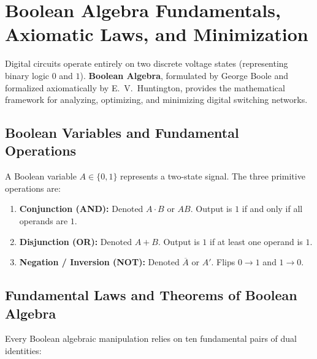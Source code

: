 \section{Boolean Algebra Fundamentals, Axiomatic Laws, and Minimization}
\label{sec:boolean_algebra}

Digital circuits operate entirely on two discrete voltage states (representing binary logic $0$ and $1$). \textbf{Boolean Algebra}, formulated by George Boole and formalized axiomatically by E.~V.~Huntington, provides the mathematical framework for analyzing, optimizing, and minimizing digital switching networks.

\subsection{Boolean Variables and Fundamental Operations}
A Boolean variable $A \in \{0, 1\}$ represents a two-state signal. The three primitive operations are:
\begin{enumerate}[label=\bfseries\arabic*.]
    \item \textbf{Conjunction (AND):} Denoted $A \cdot B$ or $AB$. Output is $1$ if and only if all operands are $1$.
    \item \textbf{Disjunction (OR):} Denoted $A + B$. Output is $1$ if at least one operand is $1$.
    \item \textbf{Negation / Inversion (NOT):} Denoted $\overline{A}$ or $A'$. Flips $0 \to 1$ and $1 \to 0$.
\end{enumerate}

\subsection{Fundamental Laws and Theorems of Boolean Algebra}
Every Boolean algebraic manipulation relies on ten fundamental pairs of dual identities:

